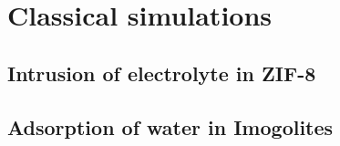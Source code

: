 \documentclass[thesis]{subfiles}
\begin{document}
\OnlyInSubfile{\setcounter{chapter}{4}}

\chapter{Classical simulations}
\startcontents[chapters]
\printpartialtoc

\section{Intrusion of electrolyte in ZIF-8}

\section{Adsorption of water in Imogolites}
\end{document}
